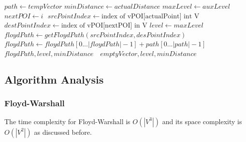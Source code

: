 \documentclass{article}
\begin{document}
\begin{algorithm}[H]
\begin{algorithmic}[1]
                    \State $path \gets tempVector$
                    \State $minDistance \gets actualDistance $
                    \State $maxLevel \gets auxLevel$
                    \State $nextPOI \gets i$
                \EndIf
            \EndIf 
            \State $ $
                \State $srcPointIndex \gets \text{index of vPOI[actualPoint] int V}$
                \State $destPointIndex \gets \text{index of vPOI[nextPOI] in V}$
                \State $level \gets maxLevel$
                \State $ $
                \State $floydPath \gets getFloydPath(srcPointIndex, desPointIndex)$
                \State $floydPath \gets floydPath[0...|floydPath|-1] + path[0... |path|-1]$  
                \State $ $
                \State $ $
                \Return $floydPath, level, minDistance$
            \EndIf
            \State $ $ 
            \State $ $
            \Return $emptyVector, level, minDistance$
        \EndFor
    \EndProcedure
    \end{algorithmic}
\end{algorithm}
    
\newpage
\subsection*{Algorithm Analysis}  
\subsubsection*{Floyd-Warshall}
The time complexity for Floyd-Warshall is $O(|V^3|)$ and its space complexity is $O(|V^2|)$ as discussed before.
\end{document}
